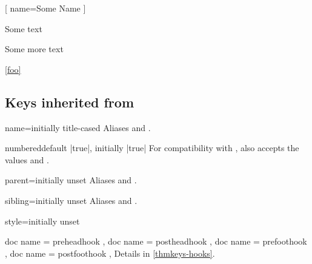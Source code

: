 \documentclass{ltxdoc}
\begin{document}
\begin{tcbwritetemp}
[
    name=Some Name
    ]
\end{tcbwritetemp}

\begin{thmkeyscode}[preamble]
\begin{mytheorem}[a note]
Some text
\end{mytheorem}

\begin{mytheorem}[
  name=a heading,
  label=foo
  ]
Some more text
\end{mytheorem}

\ref{foo}
\end{thmkeyscode}

\subsection{Keys inherited from }

\begin{docKey}[][doc label=thm/name]{name}{=}{initially title-cased }
Aliases  and .
\end{docKey}

\begin{docKey}{numbered}{}{default |true|, initially |true|}
For compatibility with , also accepts the values  and .
\end{docKey}

\begin{docKey}{parent}{=}{initially unset}
Aliases  and .
\end{docKey}

\begin{docKey}{sibling}{=}{initially unset}
Aliases  and .
\end{docKey}

\begin{docKey}{style}{=}{initially unset}

\end{docKey}

\begin{docKeys}[
  doc parameter = {=\meta{code}},
  doc description = initially unset,
  ]
  {
	{ doc name = preheadhook },
	{ doc name = postheadhook },
	{ doc name = prefoothook },
	{ doc name = postfoothook },
  }
Details in \autoref{thmkeys-hooks}.
\end{docKeys}
\end{document}
